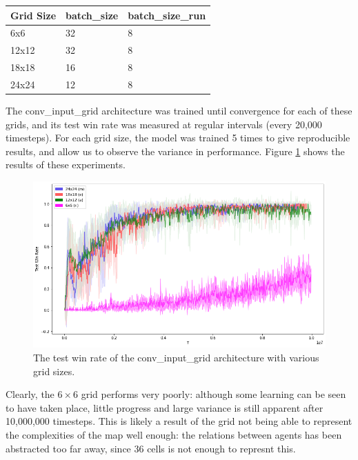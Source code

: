\vspace{3mm}

\begin{tabular}{ |p{3cm}||p{3cm}|p{3cm}|  }
 \hline
 Grid Size& batch\_size&batch\_size\_run\\
 \hline
 6x6   & 32    &8\\
 12x12   & 32    &8\\
 18x18   & 16    &8\\
 24x24   & 12    &8\\
 \hline
\end{tabular}

\vspace{3mm}

The conv\_input\_grid architecture was trained until convergence for each of these grids, and its test win rate was measured at regular intervals (every 20,000 timesteps). For each grid size, the model was trained 5 times to give reproducible results, and allow us to observe the variance in performance. Figure \ref{fig:gridsizes} shows the results of these experiments.


\begin{figure}
    \centering
    \includegraphics[scale=0.3]{images/graphs/gridsizes/allgrids.png}
    \caption{The test win rate of the conv\_input\_grid architecture with various grid sizes.}
    \label{fig:gridsizes}
\end{figure}

Clearly, the $6 \times 6$ grid performs very poorly: although some learning can be seen to have taken place, little progress and large variance is still apparent after 10,000,000 timesteps. This is likely a result of the grid not being able to represent the complexities of the map well enough: the relations between agents has been abstracted too far away, since 36 cells is not enough to represnt this.


